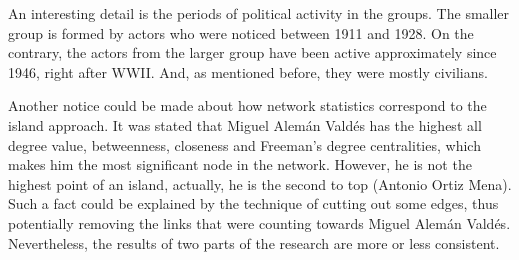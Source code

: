 An interesting detail is the periods of political activity in the groups. The smaller group is formed by actors who were noticed between 1911 and 1928. On the contrary, the actors from the larger group have been active approximately since 1946, right after WWII. And, as mentioned before, they were mostly civilians.

Another notice could be made about how network statistics correspond to the island approach. It was stated that Miguel Alemán Valdés has the highest all degree value, betweenness, closeness and Freeman’s degree centralities, which makes him the most significant node in the network. However, he is not the highest point of an island, actually, he is the second to top (Antonio Ortiz Mena). Such a fact could be explained by the technique of cutting out some edges, thus potentially removing the links that were counting towards Miguel Alemán Valdés. Nevertheless, the results of two parts of the research are more or less consistent. 

